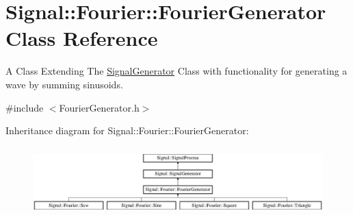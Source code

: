 \hypertarget{classSignal_1_1Fourier_1_1FourierGenerator}{\section{Signal\+:\+:Fourier\+:\+:Fourier\+Generator Class Reference}
\label{classSignal_1_1Fourier_1_1FourierGenerator}
}


A Class Extending The \hyperlink{classSignal_1_1SignalGenerator}{Signal\+Generator} Class with functionality for generating a wave by summing sinusoids.  




{\ttfamily \#include $<$Fourier\+Generator.\+h$>$}

Inheritance diagram for Signal\+:\+:Fourier\+:\+:Fourier\+Generator\+:\begin{figure}[H]
\begin{center}
\leavevmode
\includegraphics[height=2.692308cm]{classSignal_1_1Fourier_1_1FourierGenerator}
\end{center}
\end{figure}
